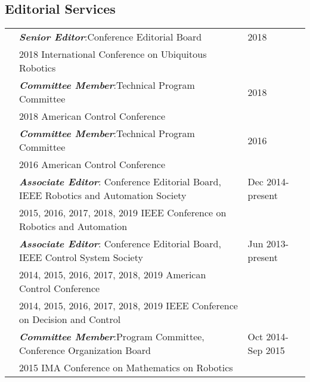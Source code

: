 \documentclass[10pt]{article}
\begin{document}
\vspace*{0.2cm}

\newcommand{\bfi}[1]{\textbf{\textit{#1}}}

\subsection*{Editorial Services}
\begin{tabularx}{\textwidth}{>{\setlength{\hsize}{0.5cm}}X%
>{\setlength{\hsize}{14.3cm}}X%
>{\hfill}X}

& \bfi{Senior Editor}:\quad Conference Editorial Board \quad  & 2018\\
& 2018 International Conference on Ubiquitous Robotics & \\[0.2cm]

& \bfi{Committee Member}:\quad Technical Program Committee \quad  & 2018\\
& 2018 American Control Conference & \\[0.2cm]

& \bfi{Committee Member}:\quad Technical Program Committee \quad  & 2016\\
& 2016 American Control Conference & \\[0.2cm]

&\bfi{Associate Editor}: Conference Editorial Board, IEEE Robotics and Automation Society & Dec 2014-present \\
& 2015, 2016, 2017, 2018, 2019 IEEE Conference on Robotics and Automation& \\[0.2cm]

&\bfi{Associate Editor}: Conference Editorial Board, IEEE Control System Society & Jun 2013-present \\
& 2014, 2015, 2016, 2017, 2018, 2019 American Control Conference& \\
& 2014, 2015, 2016, 2017, 2018, 2019 IEEE Conference on Decision and Control& \\[0.2cm]

& \bfi{Committee Member}:\quad Program Committee, Conference Organization Board\quad  & Oct 2014-Sep 2015\\
& 2015 IMA Conference on Mathematics on Robotics & \\[0.2cm]

\end{tabularx}

\vspace*{0.2cm}
\end{document}
